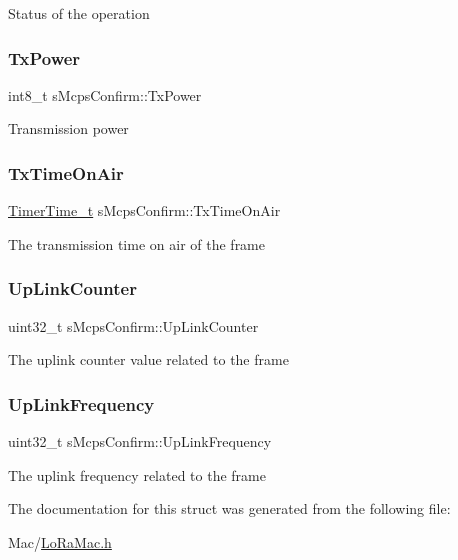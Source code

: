 Status of the operation \mbox{\label{structsMcpsConfirm_ac81b90f3a15873d1485c670630150637}} 
\subsubsection{\texorpdfstring{Tx\+Power}{TxPower}}
{\footnotesize\ttfamily int8\+\_\+t s\+Mcps\+Confirm\+::\+Tx\+Power}

Transmission power \mbox{\label{structsMcpsConfirm_add2498113d2f3fd0826f535883142de7}} 
\subsubsection{\texorpdfstring{Tx\+Time\+On\+Air}{TxTimeOnAir}}
{\footnotesize\ttfamily \hyperlink{utilities_8h_a4215ca43d3e953099ea758ce428599d0}{Timer\+Time\+\_\+t} s\+Mcps\+Confirm\+::\+Tx\+Time\+On\+Air}

The transmission time on air of the frame \mbox{\label{structsMcpsConfirm_abb52e1ad49ee429c734e8cc8da2128b5}} 
\subsubsection{\texorpdfstring{Up\+Link\+Counter}{UpLinkCounter}}
{\footnotesize\ttfamily uint32\+\_\+t s\+Mcps\+Confirm\+::\+Up\+Link\+Counter}

The uplink counter value related to the frame \mbox{\label{structsMcpsConfirm_a7baa3086fabcc4735bf6ee92b533455d}} 
\subsubsection{\texorpdfstring{Up\+Link\+Frequency}{UpLinkFrequency}}
{\footnotesize\ttfamily uint32\+\_\+t s\+Mcps\+Confirm\+::\+Up\+Link\+Frequency}

The uplink frequency related to the frame 

The documentation for this struct was generated from the following file\+:\begin{DoxyCompactItemize}
\item 
Mac/\hyperlink{LoRaMac_8h}{Lo\+Ra\+Mac.\+h}\end{DoxyCompactItemize}
